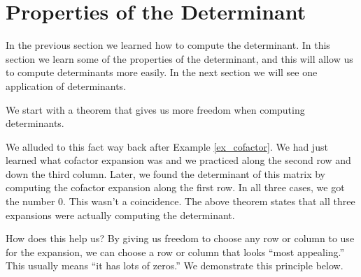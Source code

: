 \section{Properties of the Determinant}\label{sec:determinant_properties}


In the previous section we learned how to compute the determinant. In this section we learn some of the properties of the determinant, and this will allow us to compute determinants more easily. In the next section we will see one application of  determinants.

We start with a theorem that gives us more freedom when computing determinants.

\smallskip


\smallskip

We alluded to this fact way back after Example \ref{ex_cofactor}. We had just learned what cofactor expansion was and we practiced along the second row and down the third column. Later, we found the determinant of this matrix by computing the cofactor expansion along the first row. In all three cases, we got the number 0. This wasn't a coincidence. The above theorem states that all three expansions were actually computing the determinant.

How does this help us? By giving us freedom to choose any row or column to use for the expansion, we can choose a row or column that looks ``most appealing.'' This usually means ``it has lots of zeros.'' We demonstrate this principle below.

